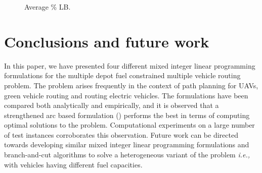 \documentclass[letterpaper, 10pt, conference]{ieeeconf}
\begin{document}
\begin{figure}
\caption{Average \% LB.}
\label{fig:LB}
\end{figure}

\section{Conclusions and future work \label{sec:conclusion}}
In this paper, we have presented four different mixed integer linear programming formulations for the multiple depot fuel constrained multiple vehicle routing problem. The problem arises frequently in the context of path planning for UAVs, green vehicle routing and routing electric vehicles. The formulations have been compared both analytically and empirically, and it is observed that a strengthened arc based formulation () performs the best in terms of computing optimal solutions to the problem. Computational experiments on a large number of test instances corroborates this observation. Future work can be directed towards developing similar mixed integer linear programming formulations and branch-and-cut algorithms to solve a heterogeneous variant of the problem \emph{i.e.,} with vehicles having different fuel capacities. 



\end{document}
